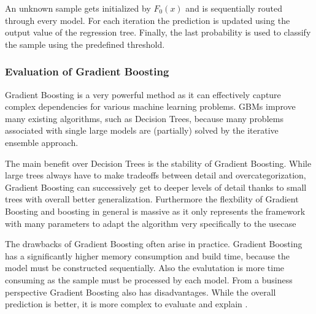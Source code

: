 An unknown sample gets initialized by \(F_{0}(x)\) and is sequentially routed through every model. For each iteration the 
prediction is updated using the output value of the regression tree. Finally, the last probability is used to classify 
the sample using the predefined threshold. 

\subsubsection{Evaluation of Gradient Boosting}

Gradient Boosting is a very powerful method as it can effectively capture complex dependencies for various machine 
learning problems. \ac{GBM}s improve many existing algorithms, such as Decision Trees, because many problems associated 
with single large models are (partially) solved by the iterative ensemble approach.

The main benefit over Decision Trees is the stability of Gradient Boosting. While large trees always have to make tradeoffs 
between detail and overcategorization, Gradient Boosting can successively get to deeper levels of detail thanks to 
small trees with overall better generalization. Furthermore the flexbility of Gradient Boosting and boosting in general is massive 
as it only represents the framework with many parameters to adapt the algorithm very specifically to the usecase \cite{Natekin2013}

The drawbacks of Gradient Boosting often arise in practice. Gradient Boosting has a significantly higher memory consumption and 
build time, because the model must be constructed sequentially. Also the evalutation is more time consuming as the sample must be processed 
by each model. From a business perspective Gradient Boosting also has disadvantages. While the overall prediction is better, it is
more complex to evaluate and explain \cite{Natekin2013} \cite[p. 27]{Buhlmann2004Bagging}. 